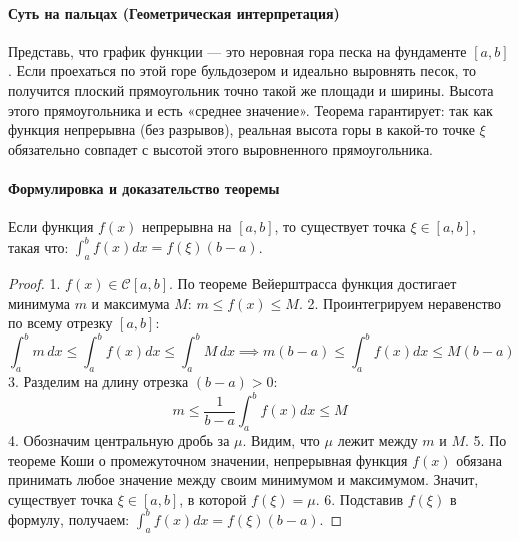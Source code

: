 \paragraph{Суть на пальцах (Геометрическая интерпретация)}
Представь, что график функции — это неровная гора песка на фундаменте $[a,b]$. Если проехаться по этой горе бульдозером и идеально выровнять песок, то получится плоский прямоугольник точно такой же площади и ширины. 
Высота этого прямоугольника и есть «среднее значение». Теорема гарантирует: так как функция непрерывна (без разрывов), реальная высота горы в какой-то точке $\xi$ обязательно совпадет с высотой этого выровненного прямоугольника.

\vspace{0.5em}
\begin{center}
\end{center}
\vspace{0.5em}

\paragraph{Формулировка и доказательство теоремы}
Если функция $f(x)$ непрерывна на $[a, b]$, то существует точка $\xi \in [a, b]$, такая что: $\int_a^b f(x) dx = f(\xi)(b - a)$.
\begin{proof}
1. $f(x) \in \mathcal{C}[a, b]$. По теореме Вейерштрасса функция достигает минимума $m$ и максимума $M$: $m \le f(x) \le M$.
2. Проинтегрируем неравенство по всему отрезку $[a, b]$:
$$ \int_a^b m \, dx \le \int_a^b f(x) dx \le \int_a^b M \, dx \implies m(b-a) \le \int_a^b f(x) dx \le M(b-a) $$
3. Разделим на длину отрезка $(b - a) > 0$:
$$ m \le \frac{1}{b - a} \int_a^b f(x) dx \le M $$
4. Обозначим центральную дробь за $\mu$. Видим, что $\mu$ лежит между $m$ и $M$.
5. По теореме Коши о промежуточном значении, непрерывная функция $f(x)$ обязана принимать любое значение между своим минимумом и максимумом. Значит, существует точка $\xi \in [a, b]$, в которой $f(\xi) = \mu$.
6. Подставив $f(\xi)$ в формулу, получаем: $\int_a^b f(x) dx = f(\xi)(b - a)$.
\end{proof}


